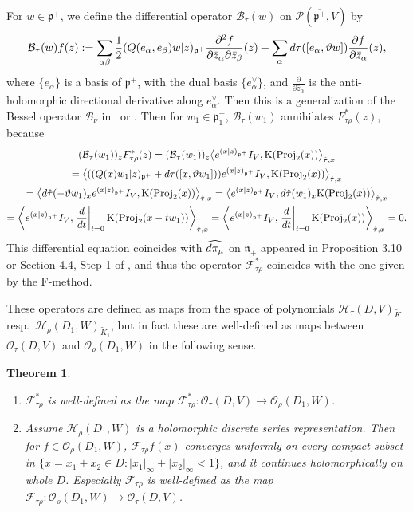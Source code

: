 \documentclass[11pt]{article}
\numberwithin{equation}{section}
\newtheorem{Theorem}{Theorem}[section]
\newcommand{\fn}{\mathfrak{n}}
\newcommand{\fp}{\mathfrak{p}}
\newcommand{\cB}{\mathcal{B}}
\newcommand{\cF}{\mathcal{F}}
\newcommand{\cH}{\mathcal{H}}
\newcommand{\cO}{\mathcal{O}}
\newcommand{\cP}{\mathcal{P}}
\newcommand{\rK}{\mathrm{K}}
\newcommand{\Proj}{\operatorname{Proj}}
\begin{document}
\begin{Remark}
For $w\in\fp^+$, we define the differential operator $\cB_\tau(w)$ on $\cP(\overline{\fp^+},V)$ by
\begin{gather*} \cB_\tau(w)f(z):=\sum_{\alpha\beta}\frac{1}{2}(Q(e_\alpha,e_\beta)w|z)_{\fp^+}
\frac{\partial^2f}{\partial\bar{z}_\alpha\partial\bar{z}_\beta}(z)
+\sum_{\alpha}{\rm d}\tau([e_\alpha,\vartheta w])\frac{\partial f}{\partial \bar{z}_\alpha}(z), \end{gather*}
where $\{e_\alpha\}$ is a basis of $\fp^+$, with the dual basis $\{e_\alpha^\vee\}$,
and $\frac{\partial}{\partial\bar{z}_\alpha}$ is the anti-holomorphic directional derivative along $e_\alpha^\vee$.
Then this is a generalization of the Bessel operator $\cB_\nu$ in~\cite{D} or \cite[Section~XV.2]{FK}.
Then for $w_1\in\fp^+_1$, $\cB_\tau(w_1)$ annihilates $F_{\tau\rho}^*(z)$, because
\begin{gather*}
 (\cB_\tau(w_1))_zF_{\tau\rho}^*(z)
=(\cB_\tau(w_1))_z\big\langle {\rm e}^{(x|z)_{\fp^+}}I_V,\rK(\Proj_2(x))\big\rangle_{\hat{\tau},x} \\
 =\big\langle ((Q(x)w_1|z)_{\fp^+}+{\rm d}\tau([x,\vartheta w_1])){\rm e}^{(x|z)_{\fp^+}}I_V,\rK(\Proj_2(x))\big\rangle_{\hat{\tau},x} \\
 =\big\langle {\rm d}\hat{\tau}(-\vartheta w_1)_x{\rm e}^{(x|z)_{\fp^+}}I_V,\rK(\Proj_2(x))\big\rangle_{\hat{\tau},x}
=\big\langle {\rm e}^{(x|z)_{\fp^+}}I_V,{\rm d}\hat{\tau}(w_1)_x\rK(\Proj_2(x))\big\rangle_{\hat{\tau},x} \\
 =\left\langle {\rm e}^{(x|z)_{\fp^+}}I_V,\left.\frac{{\rm d}}{{\rm d}t}\right|_{t=0}\rK(\Proj_2(x-tw_1))\right\rangle_{\hat{\tau},x}
=\left\langle {\rm e}^{(x|z)_{\fp^+}}I_V,\left.\frac{{\rm d}}{{\rm d}t}\right|_{t=0}\rK(\Proj_2(x))\right\rangle_{\hat{\tau},x}=0.
\end{gather*}
This differential equation coincides with $\widehat{{\rm d}\pi_\mu}$ on $\fn_+$ appeared in Proposition 3.10 or Section 4.4, Step 1
of \cite{KP1}, and thus the operator $\cF_{\tau\rho}^*$ coincides with the one given by the F-method.
\end{Remark}
These operators are defined as maps from the space of polynomials $\cH_\tau(D,V)_{\tilde{K}}$ resp.\ \linebreak $\cH_\rho(D_1,W)_{\tilde{K}_1}$,
but in fact these are well-defined as maps between
$\cO_\tau(D,V)$ and $\cO_\rho(D_1,W)$ in the following sense.
\begin{Theorem}\label{extend}\quad
\begin{enumerate}\itemsep=0pt
\item[$(1)$] $\cF_{\tau\rho}^*$ is well-defined as the map $\cF_{\tau\rho}^*\colon \cO_\tau(D,V)\to\cO_\rho(D_1,W)$.
\item[$(2)$] Assume $\cH_\rho(D_1\!{,}W)$ is a holomorphic discrete series representation. Then for  $f{\in} \cO_\rho(D_1\!{,}W)$,
$\cF_{\tau\rho}f(x)$ converges uniformly on every compact subset in $\{x=x_1+x_2\in D\colon |x_1|_\infty+|x_2|_\infty\allowbreak <1\}$,
and it continues holomorphically on whole $D$. Especially $\cF_{\tau\rho}$ is well-defined as the map
$\cF_{\tau\rho}\colon \cO_\rho(D_1,W)\to \cO_\tau(D,V)$.
\end{enumerate}
\end{Theorem}
\end{document}
